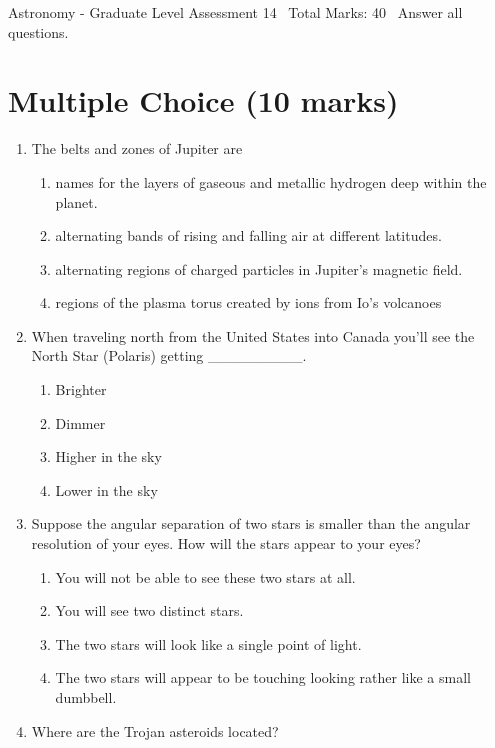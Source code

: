 \documentclass[12pt]{article}
\begin{document}
\begin{center}
Astronomy - Graduate Level Assessment 14 \
Total Marks: 40 \
Answer all questions.
\end{center}

\section*{Multiple Choice (10 marks)}
\begin{enumerate}[label=\arabic*.]
\item The belts and zones of Jupiter are
\begin{enumerate}[label=(\alph*)]
    \item names for the layers of gaseous and metallic hydrogen deep within the planet.
    \item alternating bands of rising and falling air at different latitudes.
    \item alternating regions of charged particles in Jupiter's magnetic field.
    \item regions of the plasma torus created by ions from Io's volcanoes
\end{enumerate}
\item When traveling north from the United States into Canada you'll see the North Star (Polaris) getting \_\_\_\_\_\_\_\_\_.
\begin{enumerate}[label=(\alph*)]
    \item Brighter
    \item Dimmer
    \item Higher in the sky
    \item Lower in the sky
\end{enumerate}
\item Suppose the angular separation of two stars is smaller than the angular resolution of your eyes. How will the stars appear to your eyes?
\begin{enumerate}[label=(\alph*)]
    \item You will not be able to see these two stars at all.
    \item You will see two distinct stars.
    \item The two stars will look like a single point of light.
    \item The two stars will appear to be touching looking rather like a small dumbbell.
\end{enumerate}
\item Where are the Trojan asteroids located?
\begin{enumerate}[label=(\alph*)]

\end{enumerate}
\end{enumerate}
\end{document}

